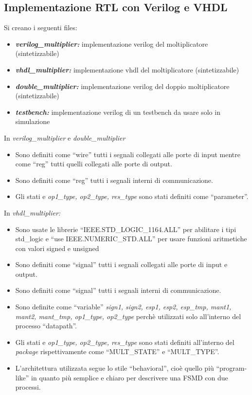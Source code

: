 \documentclass[]{IEEEtran}
\begin{document}
\subsection{Implementazione RTL con Verilog e VHDL}
Si creano i seguenti files:
\begin{itemize}
    \item {\it\bf verilog\_multiplier:} implementazione verilog del moltiplicatore (sintetizzabile)
    \item {\it\bf vhdl\_multiplier:} implementazione vhdl del moltiplicatore (sintetizzabile)
    \item {\it\bf double\_multiplier:} implementazione verilog del doppio moltiplicatore (sintetizzabile)
    \item {\it\bf testbench:} implementazione verilog di un testbench da usare solo in simulazione
\end{itemize}
In {\it verilog\_multiplier} e {\it double\_multiplier}
\begin{itemize}
    \item Sono definiti come ``wire'' tutti i segnali collegati alle porte di input mentre come ``reg'' tutti quelli collegati alle porte di output.
    \item Sono definiti come ``reg'' tutti i segnali interni di communicazione.
    \item Gli stati e {\it op1\_type, op2\_type, res\_type} sono stati definiti come ``parameter''.
\end{itemize}
In {\it vhdl\_multiplier:}
\begin{itemize}
    \item Sono usate le librerie ``IEEE.STD\_LOGIC\_1164.ALL'' per abilitare i tipi std\_logic e ``use IEEE.NUMERIC\_STD.ALL'' per usare funzioni aritmetiche con valori signed e unsigned
    \item Sono definiti come ``signal'' tutti i segnali collegati alle porte di input e output.
    \item Sono definiti come ``signal'' tutti i segnali interni di communicazione.
    \item Sono definite come ``variable'' {\it sign1, sign2, esp1, esp2, esp\_tmp, mant1, mant2, mant\_tmp, op1\_type, op2\_type} perchè utilizzati solo all'interno del processo ``datapath''.
    \item Gli stati e {\it op1\_type, op2\_type, res\_type} sono stati definiti all'interno del {\it package} rispettivamente come ``MULT\_STATE'' e ``MULT\_TYPE''.
    \item L'architettura utilizzata segue lo stile ``behavioral'', cioè quello più ``program-like'' in quanto più semplice e chiaro per descrivere una FSMD con due processi.
\end{itemize}
\end{document}
